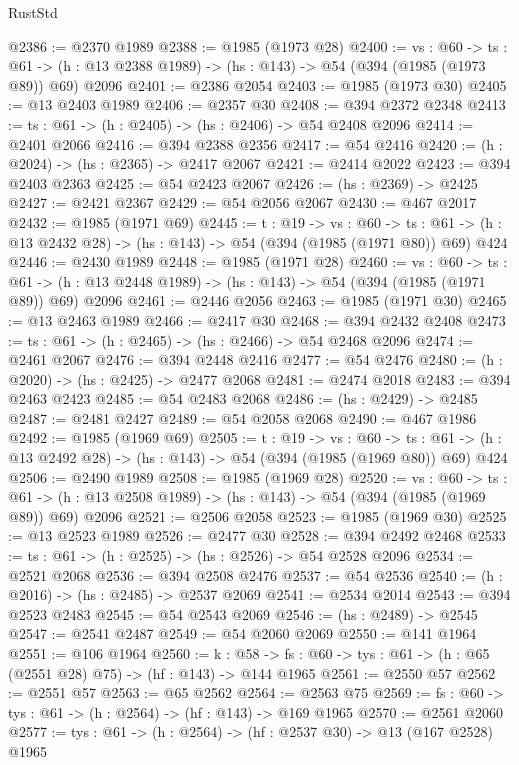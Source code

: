 \begin{lexlean}{RustStd}
\begin{coremodule}
@2386 := @2370 @1989
@2388 := @1985 (@1973 @28)
@2400 := {vs : @60} ->
  {ts : @61} -> (h : @13 @2388 @1989) -> (hs : @143) -> @54 (@394 (@1985 (@1973 @89)) @69) @2096
@2401 := @2386 @2054
@2403 := @1985 (@1973 @30)
@2405 := @13 @2403 @1989
@2406 := @2357 @30
@2408 := @394 @2372 @2348
@2413 := {ts : @61} -> (h : @2405) -> (hs : @2406) -> @54 @2408 @2096
@2414 := @2401 @2066
@2416 := @394 @2388 @2356
@2417 := @54 @2416
@2420 := (h : @2024) -> (hs : @2365) -> @2417 @2067
@2421 := @2414 @2022
@2423 := @394 @2403 @2363
@2425 := @54 @2423 @2067
@2426 := (hs : @2369) -> @2425
@2427 := @2421 @2367
@2429 := @54 @2056 @2067
@2430 := @467 @2017
@2432 := @1985 (@1971 @69)
@2445 := {t : @19} ->
  {vs : @60} ->
  {ts : @61} -> (h : @13 @2432 @28) -> (hs : @143) -> @54 (@394 (@1985 (@1971 @80)) @69) @424
@2446 := @2430 @1989
@2448 := @1985 (@1971 @28)
@2460 := {vs : @60} ->
  {ts : @61} -> (h : @13 @2448 @1989) -> (hs : @143) -> @54 (@394 (@1985 (@1971 @89)) @69) @2096
@2461 := @2446 @2056
@2463 := @1985 (@1971 @30)
@2465 := @13 @2463 @1989
@2466 := @2417 @30
@2468 := @394 @2432 @2408
@2473 := {ts : @61} -> (h : @2465) -> (hs : @2466) -> @54 @2468 @2096
@2474 := @2461 @2067
@2476 := @394 @2448 @2416
@2477 := @54 @2476
@2480 := (h : @2020) -> (hs : @2425) -> @2477 @2068
@2481 := @2474 @2018
@2483 := @394 @2463 @2423
@2485 := @54 @2483 @2068
@2486 := (hs : @2429) -> @2485
@2487 := @2481 @2427
@2489 := @54 @2058 @2068
@2490 := @467 @1986
@2492 := @1985 (@1969 @69)
@2505 := {t : @19} ->
  {vs : @60} ->
  {ts : @61} -> (h : @13 @2492 @28) -> (hs : @143) -> @54 (@394 (@1985 (@1969 @80)) @69) @424
@2506 := @2490 @1989
@2508 := @1985 (@1969 @28)
@2520 := {vs : @60} ->
  {ts : @61} -> (h : @13 @2508 @1989) -> (hs : @143) -> @54 (@394 (@1985 (@1969 @89)) @69) @2096
@2521 := @2506 @2058
@2523 := @1985 (@1969 @30)
@2525 := @13 @2523 @1989
@2526 := @2477 @30
@2528 := @394 @2492 @2468
@2533 := {ts : @61} -> (h : @2525) -> (hs : @2526) -> @54 @2528 @2096
@2534 := @2521 @2068
@2536 := @394 @2508 @2476
@2537 := @54 @2536
@2540 := (h : @2016) -> (hs : @2485) -> @2537 @2069
@2541 := @2534 @2014
@2543 := @394 @2523 @2483
@2545 := @54 @2543 @2069
@2546 := (hs : @2489) -> @2545
@2547 := @2541 @2487
@2549 := @54 @2060 @2069
@2550 := @141 @1964
@2551 := @106 @1964
@2560 := {k : @58} ->
  {fs : @60} -> {tys : @61} -> (h : @65 (@2551 @28) @75) -> (hf : @143) -> @144 @1965
@2561 := @2550 @57
@2562 := @2551 @57
@2563 := @65 @2562
@2564 := @2563 @75
@2569 := {fs : @60} -> {tys : @61} -> (h : @2564) -> (hf : @143) -> @169 @1965
@2570 := @2561 @2060
@2577 := {tys : @61} -> (h : @2564) -> (hf : @2537 @30) -> @13 (@167 @2528) @1965

\end{coremodule}
\end{lexlean}
